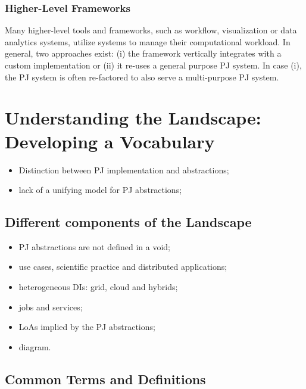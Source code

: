\documentclass{sig-alternate}
\begin{document}
\subsubsection{Higher-Level Frameworks}

Many higher-level tools and frameworks, such as workflow, visualization or
data analytics systems, utilize \pilotjob systems to manage their
computational workload. In general, two approaches exist: (i) the framework
vertically integrates with a custom \pilotjob implementation or (ii) it
re-uses a general purpose PJ system. In case (i), the PJ system is often
re-factored to also serve a multi-purpose PJ system.

\newpage
\section{Understanding the Landscape: Developing a Vocabulary}


\begin{itemize}
    \item Distinction between PJ implementation and abstractions;
    \item lack of a unifying model for PJ abstractions;
\end{itemize}

\subsection{Different components of the Landscape}


\begin{itemize}
        \item PJ abstractions are not defined in a void;
	\item use cases, scientific practice and distributed applications;
        \item heterogeneous DIs: grid, cloud and hybrids;
	\item jobs and services;
        \item LoAs implied by the PJ abstractions;
	\item diagram.
\end{itemize}

\subsection{Common Terms and Definitions}
\end{document}
